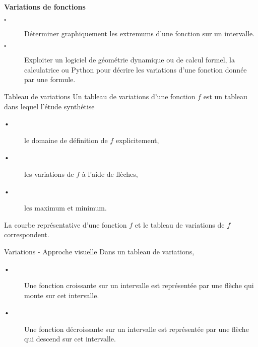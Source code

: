 \begin{titre}

\end{titre}


\begin{CpsCol}
\textbf{Variations de fonctions}
\begin{description}
\item[$\square$] Déterminer graphiquement les extremums d’une fonction sur un intervalle.
\item[$\square$] Exploiter un logiciel de géométrie dynamique ou de calcul formel, la calculatrice ou Python pour décrire les variations d’une fonction donnée par une formule.
\end{description}
\end{CpsCol}


\begin{DefT}{Tableau de variations}
Un tableau de variations d'une fonction $f$ est un tableau dans lequel l'étude synthétise
\begin{description}
\item[•] le domaine de définition de $f$ explicitement,
\item[•] les variations de $f$ à l'aide de flèches,
\item[•] les maximum et minimum.
\end{description} 

\end{DefT}





\begin{Rq}
La courbe représentative d'une fonction $f$ et le tableau de variations de $f$ correspondent.
\end{Rq}


\begin{DefT}{Variations - Approche visuelle}
Dans un tableau de variations,
\begin{description}
\item[•] Une fonction croissante sur un intervalle est représentée par une flèche qui monte sur cet intervalle.
\item[•] Une fonction décroissante sur un intervalle est représentée par une flèche qui descend sur cet intervalle.
\end{description}
\end{DefT}



